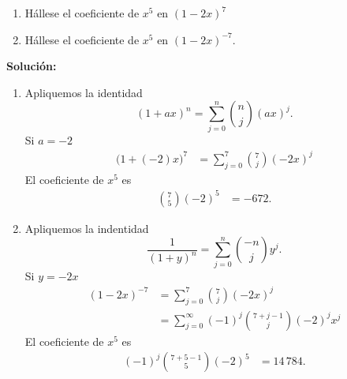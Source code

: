 \begin{myexample}
	\begin{enumerate}[label=\alph*)]
	    \item Hállese el coeficiente de $x^5$ en $(1 - 2x)^7$
        \item Hállese el coeficiente de $x^5$ en $(1 - 2x)^{-7}$.
	\end{enumerate}
    
	\tcblower
	\textbf{\color{jblueleft}Solución:}
	\begin{enumerate}[label=\alph*)]
		\item Apliquemos la identidad
		$$(1 + ax)^n = \sum_{j=0}^{n} \binom{n}{j} (ax)^j.$$
		Si $a = -2$
		\begin{align*}
			\big(1 + (-2)x\big)^7 & = \sum_{j=0}^{7} \binom{7}{j} (-2x)^j
		\end{align*}
		El coeficiente de $x^5$ es
		\begin{align*}
			\binom{7}{5} (-2)^5 & = - 672.
		\end{align*}

		\item Apliquemos la indentidad
		$$\frac{1}{(1+y)^n} = \sum_{j=0}^{n} \binom{-n}{j} y^j.$$
		Si $y = -2x$
		\begin{align*}
			(1 - 2x)^{-7} & = \sum_{j=0}^{7} \binom{7}{j} (-2x)^j \\
			& = \sum_{j=0}^{\infty} (-1)^j \binom{7+j-1}{j} (-2)^jx^j
		\end{align*}
		El coeficiente de $x^5$ es
		\begin{align*}
			(-1)^j \binom{7+5-1}{5} (-2)^5 & = 14 \, 784.
		\end{align*}
	\end{enumerate}
\end{myexample}

